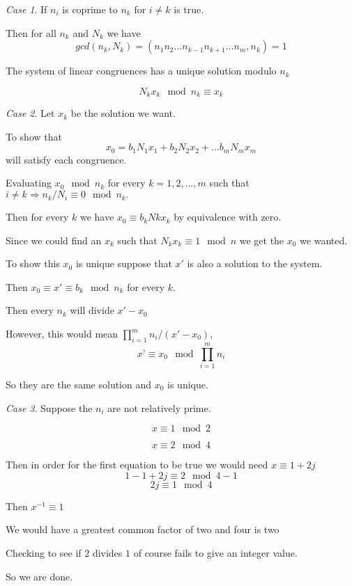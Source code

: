 \documentclass[10pt,a4paper,titlepage,twoside,draft]{article}
\theoremstyle{plain}
\theoremstyle{definition}
\theoremstyle{remark}
\newtheorem{case}{Case}
\begin{document}
\medskip

\begin{case}     
If $n_{i}$ is coprime to $n_{k}$ for $i \neq k$ is true.
    
Then for all $n_{k}$ and $N_{k}$ we have 
\[gcd( n_{k},N_{k}) = (n_{1}n_{2} \ldots n_{k-1}n_{k+1} \ldots n_{m},n_{k})=1\]
     
The system of linear congruences has a unique solution modulo $n_{k}$
    
\[N_{k}x_{k}\mod{n_{k}} \equiv x_{k}\]
\end{case}    
    
\medskip
    
\begin{case}
Let $x_{k}$ be the solution we want.
     
To show that \[x_{0} = b_{1}N_{1}x_{1} + b_{2}N_{2}x_{2} + \ldots b_{m}N_{m}x_{m}\] will satisfy each congruence.
     
Evaluating $x_{0} \mod{n}_{k}$ for every $k = {1,2, \ldots, m}$ such that $i \neq k \Rightarrow n_{k}/N_{i} \equiv 0 \mod{n}_{k}.$
     
Then for every $k$ we have $x_{0} \equiv b_{k}N{k}x_{k}$ by equivalence with zero.
    
Since we could find an $x_{k}$ such that $N_{k}x_{k} \equiv 1\mod{n}$ we get the $x_{0}$ we wanted. 
     
To show this $x_{0}$ is unique suppose that $x'$ is also a solution to the system. 

Then $x_{0} \equiv x' \equiv b_{k}\mod{n}_{k}$ for every $k$.

    
Then every $n_k$ will divide $x' - x_{0}$
    
However, this would mean $\prod_{i=1}^{m} n_{i}/(x'-x_{0})$,
\[x’ \equiv x_{0} \mod{\prod_{i=1}^{m} n_{i}}\]
     
So they are the same solution and $x_{0}$ is unique.
\end{case}

\medskip

\begin{case}    
Suppose the $n_{i}$ are not relatively prime.
    
\[x \equiv 1\mod{2}\]
    
\[x \equiv 2\mod{4}\]
     
Then in order for the first equation to be true we would need $x \equiv 1 +2j$ 
\[1 - 1 + 2j \equiv 2\mod{4 - 1} \]
\[2j \equiv 1 \mod{4} \]
     
Then $x^{-1} \equiv 1$
    
We would have a greatest common factor of two and four is two
    
Checking to see if $2$ divides $1$ of course fails to give an integer value.
    
So we are done.
\end{case}
\end{document}
